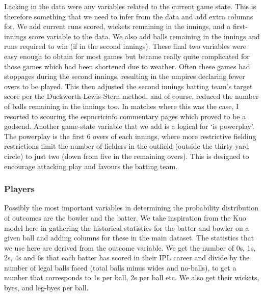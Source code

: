 Lacking in the data were any variables related to the current game state. This is therefore something that we need to infer from the data and add extra columns for. We add current runs scored, wickets remaining in the innings, and a first-innings score variable to the data. We also add balls remaining in the innings and runs required to win (if in the second innings). These final two variables were easy enough to obtain for most games but became really quite complicated for those games which had been shortened due to weather. Often these games had stoppages during the second innings, resulting in the umpires declaring fewer overs to be played. This then adjusted the second innings batting team’s target score per the Duckworth-Lewis-Stern method, and of course, reduced the number of balls remaining in the innings too. In matches where this was the case, I resorted to scouring the espncricinfo commentary pages \cite{noauthor_live_nodate} which proved to be a godsend. Another game-state variable that we add is a logical for ‘is powerplay’. The powerplay is the first 6 overs of each innings\footnotemark{}, where more restrictive fielding restrictions limit the number of fielders in the outfield (outside the thirty-yard circle) to just two (down from five in the remaining overs). This is designed to encourage attacking play and favours the batting team.


\subsubsection{Players}

Possibly the most important variables in determining the probability distribution of outcomes are the bowler and the batter. We take inspiration from the Kuo model here in gathering the historical statistics for the batter and bowler on a given ball and adding columns for these in the main dataset. The statistics that we use here are derived from the outcome variable. We get the number of 0s, 1s, 2s, 4s and 6s\footnotemark{} that each batter has scored in their IPL career and divide by the number of legal balls faced (total balls minus wides and no-balls), to get a number that corresponds to 1s per ball, 2s per ball etc. We also get their wickets, byes, and leg-byes per ball.


